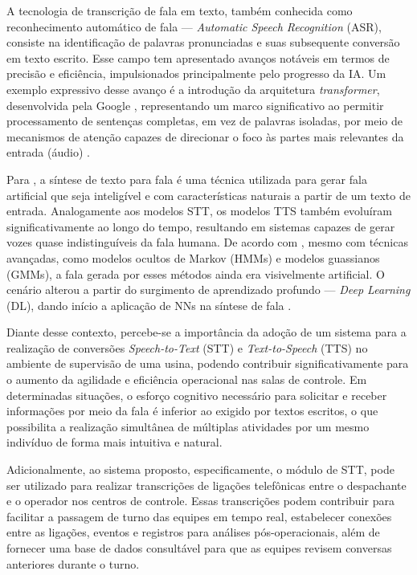 \documentclass[
	12pt,				%
	a4paper,			%
	english,			%
	brazil,				%
	]{article}
\begin{document}
A tecnologia de transcrição de fala em texto, também conhecida como reconhecimento automático de fala — \textit{Automatic Speech Recognition} (ASR), consiste na identificação de palavras pronunciadas e suas subsequente conversão em texto escrito. Esse campo tem apresentado avanços notáveis em termos de precisão e eficiência, impulsionados principalmente pelo progresso da IA. Um exemplo expressivo desse avanço é a introdução da arquitetura \textit{transformer}, desenvolvida pela Google \cite{vaswani2017}, representando um marco significativo ao permitir processamento de sentenças completas, em vez de palavras isoladas, por meio de mecanismos de atenção capazes de direcionar o foco às partes mais relevantes da entrada (áudio) \cite{utkarsh2024}.

Para , a síntese de texto para fala é uma técnica utilizada para gerar fala artificial que seja inteligível e com características naturais a partir de um texto de entrada. Analogamente aos modelos STT, os modelos TTS também evoluíram significativamente ao longo do tempo, resultando em sistemas capazes de gerar vozes quase indistinguíveis da fala humana. De acordo com , mesmo com técnicas avançadas, como modelos ocultos de Markov (HMMs) e modelos guassianos (GMMs), a fala gerada por esses métodos ainda era visivelmente artificial. O cenário alterou a partir do surgimento de aprendizado profundo — \textit{Deep Learning} (DL), dando início a aplicação de NNs na síntese de fala \cite{barakat2024}.

Diante desse contexto, percebe-se a importância da adoção de um sistema para a realização de conversões \textit{Speech-to-Text} (STT) e \textit{Text-to-Speech} (TTS) no ambiente de supervisão de uma usina, podendo contribuir significativamente para o aumento da agilidade e eficiência operacional nas salas de controle. Em determinadas situações, o esforço cognitivo necessário para solicitar e receber informações por meio da fala é inferior ao exigido por textos escritos, o que possibilita a realização simultânea de múltiplas atividades por um mesmo indivíduo de forma mais intuitiva e natural.

Adicionalmente, ao sistema proposto, especificamente, o módulo de STT, pode ser utilizado para realizar transcrições de ligações telefônicas entre o despachante e o operador nos centros de controle. Essas transcrições podem contribuir para facilitar a passagem de turno das equipes em tempo real, estabelecer conexões entre as ligações, eventos e registros para análises pós-operacionais, além de fornecer uma base de dados consultável para que as equipes revisem conversas anteriores durante o turno. 
\end{document}
